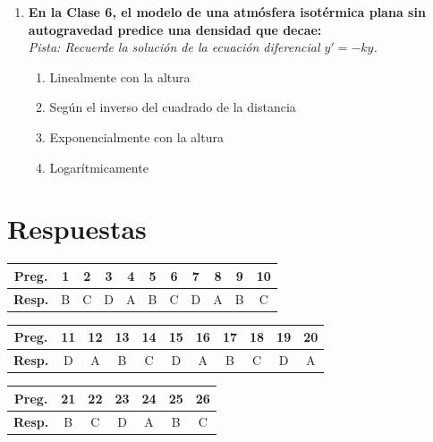 \documentclass[12pt,a4paper]{article}
\begin{document}
\begin{enumerate}[label=\textbf{\arabic*.}, itemsep=1.5em]
\item \textbf{En la Clase 6, el modelo de una atmósfera isotérmica plana sin autogravedad predice una densidad que decae:} \\
\textit{Pista: Recuerde la solución de la ecuación diferencial $y' = -ky$.}
\begin{enumerate}[label=\alph*), leftmargin=*]
    \item Linealmente con la altura
    \item Según el inverso del cuadrado de la distancia
    \item Exponencialmente con la altura
    \item Logarítmicamente
\end{enumerate}

\end{enumerate}

\newpage
\section*{Respuestas}

\begin{center}
\renewcommand{\arraystretch}{1.5}
\begin{tabular}{|c|c|c|c|c|c|c|c|c|c|c|}
\hline
\textbf{Preg.} & 1 & 2 & 3 & 4 & 5 & 6 & 7 & 8 & 9 & 10 \\ \hline
\textbf{Resp.} & B & C & D & A & B & C & D & A & B & C \\ \hline
\end{tabular}
\vspace{0.4cm}

\begin{tabular}{|c|c|c|c|c|c|c|c|c|c|c|}
\hline
\textbf{Preg.} & 11 & 12 & 13 & 14 & 15 & 16 & 17 & 18 & 19 & 20 \\ \hline
\textbf{Resp.} & D & A & B & C & D & A & B & C & D & A \\ \hline
\end{tabular}
\vspace{0.4cm}

\begin{tabular}{|c|c|c|c|c|c|c|}
\hline
\textbf{Preg.} & 21 & 22 & 23 & 24 & 25 & 26 \\ \hline
\textbf{Resp.} & B & C & D & A & B & C \\ \hline
\end{tabular}
\end{center}
\end{document}
